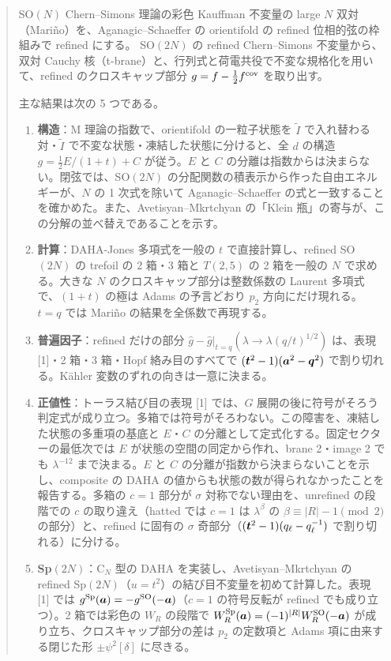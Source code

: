 \begin{abstract}
SO$(N)$ Chern--Simons 理論の彩色 Kauffman 不変量の large $N$ 双対（Mariño）を、Aganagic--Schaeffer の orientifold の refined 位相的弦の枠組みで refined にする。
SO$(2N)$ の refined Chern--Simons 不変量から、双対 Cauchy 核（t-brane）と、行列式と荷電共役で不変な規格化を用いて、refined のクロスキャップ部分 $g = f - \tfrac12 f^{\cov}$ を取り出す。

主な結果は次の 5 つである。
\begin{enumerate}
\item \textbf{構造}：M 理論の指数で、orientifold の一粒子状態を $\tilde I$ で入れ替わる対・$\tilde I$ で不変な状態・凍結した状態に分けると、全 $d$ の構造 $g = \tfrac12 E/(1+t) + C$ が従う。$E$ と $C$ の分離は指数からは決まらない。閉弦では、SO$(2N)$ の分配関数の積表示から作った自由エネルギーが、$N$ の 1 次式を除いて Aganagic--Schaeffer の式と一致することを確かめた。また、Avetisyan--Mkrtchyan の「Klein 瓶」の寄与が、この分解の並べ替えであることを示す。
\item \textbf{計算}：DAHA-Jones 多項式を一般の $t$ で直接計算し、refined SO$(2N)$ の trefoil の 2 箱・3 箱と $T(2,5)$ の 2 箱を一般の $N$ で求める。大きな $N$ のクロスキャップ部分は整数係数の Laurent 多項式で、$(1+t)$ の極は Adams の予言どおり $p_2$ 方向にだけ現れる。$t = q$ では Mariño の結果を全係数で再現する。
\item \textbf{普遍因子}：refined だけの部分 $\hat g - \hat g|_{t=q}(\lambda \to \lambda (q/t)^{1/2})$ は、表現 [1]・2 箱・3 箱・Hopf 絡み目のすべてで $(\bt^2 - 1)(\ba^2 - \bq^2)$ で割り切れる。Kähler 変数のずれの向きは一意に決まる。
\item \textbf{正値性}：トーラス結び目の表現 [1] では、$G$ 展開の後に符号がそろう判定式が成り立つ。多箱では符号がそろわない。この障害を、凍結した状態の多重項の基底と $E$・$C$ の分離として定式化する。固定セクターの最低次では $E$ が状態の空間の同定から作れ、brane 2・image 2 でも $\lambda^{-12}$ まで決まる。$E$ と $C$ の分離が指数から決まらないことを示し、composite の DAHA の値からも状態の数が得られなかったことを報告する。多箱の $c = 1$ 部分が $\sigma$ 対称でない理由を、unrefined の段階での $c$ の取り違え（hatted では $c = 1$ は $\lambda^\beta$ の $\beta \equiv |R| - 1 \pmod 2$ の部分）と、refined に固有の $\sigma$ 奇部分（$(\bt^2-1)(\ql - \ql^{-1})$ で割り切れる）に分ける。
\item \textbf{Sp$(2N)$}：C$_N$ 型の DAHA を実装し、Avetisyan--Mkrtchyan の refined Sp$(2N)$（$u = t^2$）の結び目不変量を初めて計算した。表現 [1] では $g^{\mathrm{Sp}}(\ba) = -g^{\SO}(-\ba)$（$c = 1$ の符号反転が refined でも成り立つ）。2 箱では彩色の $W_R$ の段階で $W^{\mathrm{Sp}}_R(\ba) = (-1)^{|R|}W^{\SO}_R(-\ba)$ が成り立ち、クロスキャップ部分の差は $p_2$ の定数項と Adams 項に由来する閉じた形 $\pm\psi^2[\delta]$ に尽きる。
\end{enumerate}
\end{abstract}

